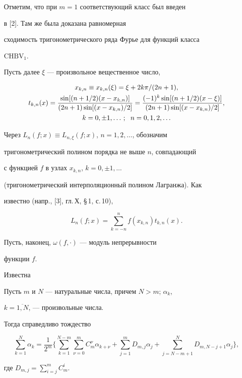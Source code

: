 Отметим, что при $m=1$ соответствующий класс был введен 


в [2]. Там же была доказана равномерная


сходимость тригонометрического ряда Фурье для функций класса


$\mathrm{CHBV}_1$.





Пусть далее $\xi$ --- произвольное вещественное число,


\begin{gather}


x_{k,n}\equiv x_{k,n}(\xi)=\xi+2k\pi/(2n+1),\notag \\


t_{k,n}(x)=\frac{\sin[(n+1/2)(x-x_{k,n})]}{(2n+1)\sin[(x-


x_{k,n})/2]}=\frac{(-1)^k\sin[(n+1/2)(x-\xi)]}{(2n+1)\sin[(x-


x_{k,n})/2]}, \\


k=0,\pm 1,\dotsc;\ \; n=0,1,2,\dotsc \notag


\end{gather}


Через $L_n(f;x)\equiv L_{n,\xi}(f;x)$, $n=1,2,\dotsc$, обозначим 


тригонометрический полином порядка не выше $n$, совпадающий


с функцией $f$ в узлах $x_{k,n}$, $k=0,\pm 1,\dotsc$ 


(тригонометрический интерполяционный полином Лагранжа). Как


известно (напр., [3], гл.\,Х, \S\,1, с.\,10),


$$


L_n(f;x)=\sum_{k=-n}^nf(x_{k,n})t_{k,n}(x).


$$


Пусть, наконец, $\omega(f,\cdot)$ --- модуль непрерывности


функции $f$.





Известна





\begin{lem}


Пусть $m$ и $N$ --- натуральные числа, причем $N>m$; $\alpha_k$,


$k=\overline {1,N}$, --- произвольные числа.


Тогда справедливо тождество


$$


\sum_{k=1}^N\alpha_k=\frac1{2^m}\bigg\{\sum_{k=1}^{N-m}\sum_


{\nu=0}^mC_m^{\nu}\alpha_{k+\nu}+\sum_{j=1}^mD_{m,j}\alpha_j+


\sum_{j=N-m+1}^ND_{m,N-j+1}\alpha_j\bigg\},


$$


где $D_{m,j}=\sum\limits_{i=j}^mC_m^i$.


\end{lem}





